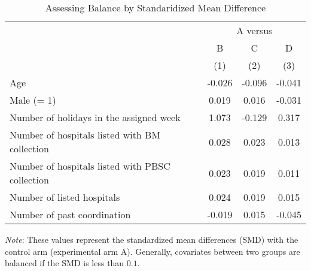 \documentclass[12pt, a4paper]{article}
\begin{document}
\begin{table}[H]

\caption{\label{tab:smd-balance}Assessing Balance by Standaridized Mean Difference}
\centering
\fontsize{8}{10}\selectfont
\begin{threeparttable}
\begin{tabular}[t]{lccc}
\toprule
\multicolumn{1}{c}{ } & \multicolumn{3}{c}{A versus} \\
\cmidrule(l{3pt}r{3pt}){2-4}
\multicolumn{1}{c}{ } & \multicolumn{1}{c}{B} & \multicolumn{1}{c}{C} & \multicolumn{1}{c}{D} \\
\cmidrule(l{3pt}r{3pt}){2-2} \cmidrule(l{3pt}r{3pt}){3-3} \cmidrule(l{3pt}r{3pt}){4-4}
 & (1) & (2) & (3)\\
\midrule
Age & -0.026 & -0.096 & -0.041\\
Male (= 1) & 0.019 & 0.016 & -0.031\\
Number of holidays in the assigned week & 1.073 & -0.129 & 0.317\\
Number of hospitals listed with BM collection & 0.028 & 0.023 & 0.013\\
Number of hospitals listed with PBSC collection & 0.023 & 0.019 & 0.011\\
Number of listed hospitals & 0.024 & 0.019 & 0.015\\
Number of past coordination & -0.019 & 0.015 & -0.045\\
\bottomrule
\end{tabular}
\begin{tablenotes}
\item \emph{Note}: These values represent the standardized mean differences (SMD) with the control arm (experimental arm A). Generally, covariates between two groups are balanced if the SMD is less than $0.1$.
\end{tablenotes}
\end{threeparttable}
\end{table}
\end{document}
